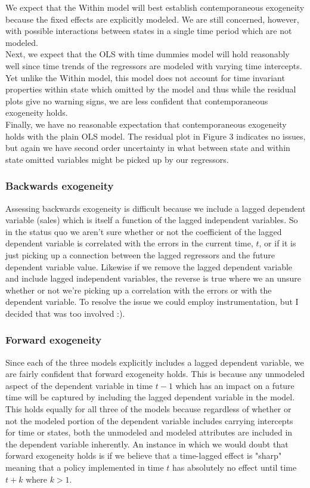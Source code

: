 \documentclass{article}
\begin{document}
We expect that the Within model will best establish contemporaneous exogeneity because the fixed effects are explicitly modeled. We are still concerned, however, with possible interactions between states in a single time period which are not modeled.\\

Next, we expect that the OLS with time dummies model will hold reasonably well since time trends of the regressors are modeled with varying time intercepts. Yet unlike the Within model, this model does not account for time invariant properties within state which omitted by the model and thus while the residual plots give no warning signs, we are less confident that contemporaneous exogeneity holds.\\

Finally, we have no reasonable expectation that contemporaneous exogeneity holds with the plain OLS model. The residual plot in Figure 3 indicates no issues, but again we have second order uncertainty in what between state and within state omitted variables might be picked up by our regressors.

\subsubsection{Backwards exogeneity}
Assessing backwards exogeneity is difficult because we include a lagged dependent variable (sales) which is itself a function of the lagged independent variables. So in the status quo we aren't sure whether or not the coefficient of the lagged dependent variable is correlated with the errors in the current time, $t$, or if it is just picking up a connection between the lagged regressors and the future dependent variable value. Likewise if we remove the lagged dependent variable and include lagged independent variables, the reverse is true where we an unsure whether or not we're picking up a correlation with the errors or with the dependent variable. To resolve the issue we could employ instrumentation, but I decided that was too involved :).

\subsubsection{Forward exogeneity}
Since each of the three models explicitly includes a lagged dependent variable, we are fairly confident that forward exogeneity holds. This is because any unmodeled aspect of the dependent variable in time $t-1$ which has an impact on a future time will be captured by including the lagged dependent variable in the model. This holds equally for all three of the models because regardless of whether or not the modeled portion of the dependent variable includes carrying intercepts for time or states, both the unmodeled and modeled attributes are included in the dependent variable inherently. An instance in which we would doubt that forward exogeneity holds is if we believe that a time-lagged effect is "sharp" meaning that a policy implemented in time $t$ has absolutely no effect until time $t+k$ where $k > 1$.
\end{document}
